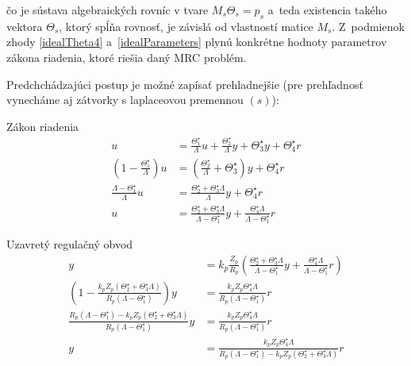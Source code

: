 \documentclass[a4paper, 10pt, ]{article}
\begin{document}
čo je sústava algebraických rovníc v tvare $M_s \Theta_s = p_s$ a~teda existencia takého vektora $\Theta_s$, ktorý spĺňa rovnosť, je závislá od vlastností matice $M_s$. Z~podmienok zhody \eqref{idealTheta4} a~\eqref{idealParameters} plynú konkrétne hodnoty parametrov zákona riadenia, ktoré riešia daný MRC problém.

Predchchádzajúci postup je možné zapísať prehladnejšie (pre prehľadnosť vynecháme aj zátvorky s laplaceovou premennou $(s)$):

Zákon riadenia
\begin{subequations}
	\begin{align}
		u
		&=
		\frac{\Theta_1^\star}{\Lambda}
		u
		+
		\frac{\Theta_2^\star}{\Lambda}
		y
		+
		\Theta_3^\star
		y
		+
		\Theta_4^\star
		r
		\\
		\left(
			1
			-
			\frac{\Theta_1^\star}{\Lambda}
		\right)
		u
		&=
		\left(
			\frac{\Theta_2^\star}{\Lambda}
			+
			\Theta_3^\star
		\right)
		y
		+
		\Theta_4^\star
		r
		\\
		\frac{\Lambda - \Theta_1^\star}{\Lambda}
		u
		&=
		\frac{
			\Theta_2^\star
			+
			\Theta_3^\star\Lambda
			}{
			\Lambda}
		y
		+
		\Theta_4^\star
		r
		\\
		u
		&=
		\frac{
			\Theta_2^\star
			+
			\Theta_3^\star\Lambda
			}{
			\Lambda - \Theta_1^\star}
		y
		+
		\frac{
		\Theta_4^\star \Lambda
		}{
		\Lambda - \Theta_1^\star}
		r
	\end{align}
\end{subequations}

Uzavretý regulačný obvod
\begin{subequations}
	\begin{align}
		y
		&=
		k_p
		\frac{Z_p}{R_p}
		\left(
				\frac{
			\Theta_2^\star
			+
			\Theta_3^\star\Lambda
			}{
			\Lambda - \Theta_1^\star}
		y
		+
		\frac{
		\Theta_4^\star \Lambda
		}{
		\Lambda - \Theta_1^\star}
		r
		\right)
\\
		\left(
			1
			-
			\frac{
				k_p
				Z_p
				\left(
					\Theta_2^\star
					+
					\Theta_3^\star\Lambda
				\right)
				}{
				R_p
				\left(
					\Lambda - \Theta_1^\star
				\right)}
		\right)
		y
		&=
		\frac{
			k_p
			Z_p
			\Theta_4^\star
			\Lambda
			}{
			R_p
			\left(
				\Lambda - \Theta_1^\star
			\right)}
		r
\\
		\frac{
			R_p
			\left(
				\Lambda - \Theta_1^\star
			\right)
			-
			k_p
			Z_p
			\left(
				\Theta_2^\star
				+
				\Theta_3^\star\Lambda
			\right)
			}{
			R_p
			\left(
				\Lambda - \Theta_1^\star
			\right)}
		y
		&=
		\frac{
			k_p
			Z_p
			\Theta_4^\star
			\Lambda
			}{
			R_p
			\left(
				\Lambda - \Theta_1^\star
			\right)}
		r
\\
		y
		&=
		\frac{
			k_p
			Z_p
			\Theta_4^\star
			\Lambda
			}{
			R_p
			\left(
				\Lambda - \Theta_1^\star
			\right)
			-
			k_p
			Z_p
			\left(
				\Theta_2^\star
				+
				\Theta_3^\star\Lambda
			\right)}
		r
	\end{align}
\end{subequations}
\end{document}
